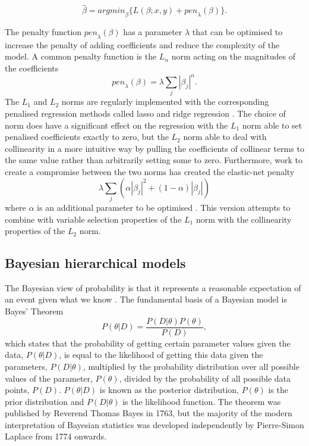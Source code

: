 \documentclass[../main.tex]{subfiles}
\begin{document}
$$ \hat{\beta} =\mathit{argmin}_{\beta} \{L(\beta;x,y) + \mathit{pen}_\lambda(\beta)\}. $$

The penalty function $\mathit{pen}_\lambda(\beta)$ has a parameter $\lambda$ that can be optimised to increase the penalty of adding coefficients and reduce the complexity of the model.
A common penalty function is the $L_n$ norm acting on the magnitudes of the coefficients
$$\mathit{pen}_\lambda(\beta) = \lambda \sum_j |\beta_j|^n.$$
The $L_1$ and $L_2$ norms are regularly implemented with the corresponding penalised regression methods called lasso and ridge regression \parencite{Tibshirani1996, Hoerl1970}. 
The choice of norm does have a significant effect on the regression with the $L_1$ norm able to set penalised coefficients exactly to zero, but the $L_2$ norm able to deal with collinearity in a more intuitive way by pulling the coefficients of collinear terms to the same value rather than arbitrarily setting some to zero.
Furthermore, work to create a compromise between the two norms has created the elastic-net penalty 
$$\lambda \sum_j (\alpha |\beta_j|^2 + (1-\alpha)|\beta_j|)$$
where $\alpha$ is an additional parameter to be optimised \parencite{Zou2005}. 
This version attempts to combine with variable selection properties of the $L_1$ norm with the collinearity properties of the $L_2$ norm.

\subsection{Bayesian hierarchical models}
The Bayesian view of probability is that it represents a reasonable expectation of an event given what we know \parencite{Cox1946}.
The fundamental basis of a Bayesian model is Bayes' Theorem 
$$P(\theta|D) = \frac{P(D|\theta)P(\theta)}{P(D)},$$
which states that the probability of getting certain parameter values given the data, $P(\theta|D)$, is equal to the likelihood of getting this data given the parameters, $P(D|\theta)$, multiplied by the probability distribution over all possible values of the parameter, $P(\theta)$,  divided by the probability of all possible data points, $P(D)$.
$P(\theta|D)$ is known as the posterior distribution, $P(\theta)$ is the prior distribution and $P(D|\theta)$ is the likelihood function.
The theorem was published by Reverend Thomas Bayes in 1763, but the majority of the modern interpretation of Bayesian statistics was developed independently by Pierre-Simon Laplace from 1774 onwards.
\end{document}
